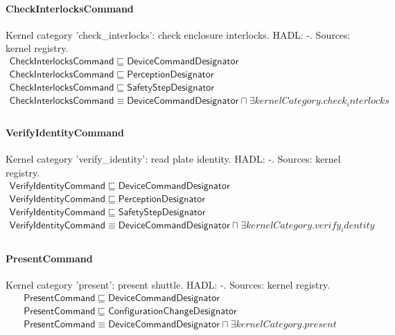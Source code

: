 \documentclass[10pt]{article}
\begin{document}
\paragraph{CheckInterlocksCommand} Kernel category 'check\_interlocks': check enclosure interlocks. HADL: -. Sources: kernel registry.
\[\begin{array}{l}
\mathsf{CheckInterlocksCommand} \sqsubseteq  \mathsf{DeviceCommandDesignator} \\
\mathsf{CheckInterlocksCommand} \sqsubseteq  \mathsf{PerceptionDesignator} \\
\mathsf{CheckInterlocksCommand} \sqsubseteq  \mathsf{SafetyStepDesignator} \\
\mathsf{CheckInterlocksCommand} \equiv  \mathsf{DeviceCommandDesignator} \sqcap  \exists \mathit{kernelCategory}.{check_interlocks} \\
\end{array}\]
\paragraph{VerifyIdentityCommand} Kernel category 'verify\_identity': read plate identity. HADL: -. Sources: kernel registry.
\[\begin{array}{l}
\mathsf{VerifyIdentityCommand} \sqsubseteq  \mathsf{DeviceCommandDesignator} \\
\mathsf{VerifyIdentityCommand} \sqsubseteq  \mathsf{PerceptionDesignator} \\
\mathsf{VerifyIdentityCommand} \sqsubseteq  \mathsf{SafetyStepDesignator} \\
\mathsf{VerifyIdentityCommand} \equiv  \mathsf{DeviceCommandDesignator} \sqcap  \exists \mathit{kernelCategory}.{verify_identity} \\
\end{array}\]
\paragraph{PresentCommand} Kernel category 'present': present shuttle. HADL: -. Sources: kernel registry.
\[\begin{array}{l}
\mathsf{PresentCommand} \sqsubseteq  \mathsf{DeviceCommandDesignator} \\
\mathsf{PresentCommand} \sqsubseteq  \mathsf{ConfigurationChangeDesignator} \\
\mathsf{PresentCommand} \equiv  \mathsf{DeviceCommandDesignator} \sqcap  \exists \mathit{kernelCategory}.{present} \\
\end{array}\]
\end{document}
